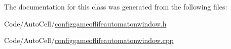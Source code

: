 The documentation for this class was generated from the following files\+:\begin{DoxyCompactItemize}
\item 
Code/\+Auto\+Cell/\mbox{\hyperlink{configgameoflifeautomatonwindow_8h}{configgameoflifeautomatonwindow.\+h}}\item 
Code/\+Auto\+Cell/\mbox{\hyperlink{configgameoflifeautomatonwindow_8cpp}{configgameoflifeautomatonwindow.\+cpp}}\end{DoxyCompactItemize}
